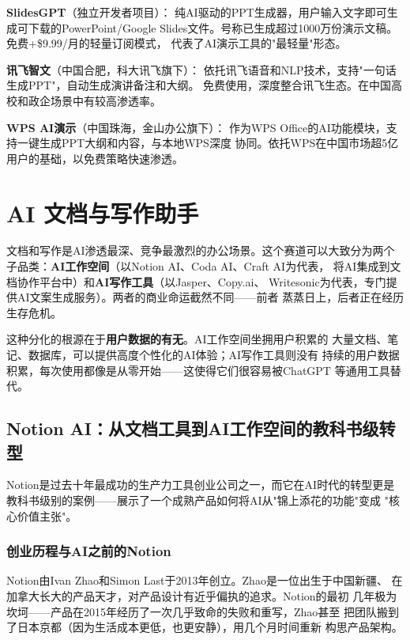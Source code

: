 \textbf{SlidesGPT}（独立开发者项目）：
纯AI驱动的PPT生成器，用户输入文字即可生成可下载的PowerPoint/Google
Slides文件。号称已生成超过1000万份演示文稿。免费+\$9.99/月的轻量订阅模式，
代表了AI演示工具的"最轻量"形态。

\textbf{讯飞智文}（中国合肥，科大讯飞旗下）：
依托讯飞语音和NLP技术，支持"一句话生成PPT"，自动生成演讲备注和大纲。
免费使用，深度整合讯飞生态。在中国高校和政企场景中有较高渗透率。

\textbf{WPS AI演示}（中国珠海，金山办公旗下）：
作为WPS Office的AI功能模块，支持一键生成PPT大纲和内容，与本地WPS深度
协同。依托WPS在中国市场超5亿用户的基础，以免费策略快速渗透。



\section{AI 文档与写作助手}
\label{sec:cprod-docs}

文档和写作是AI渗透最深、竞争最激烈的办公场景。这个赛道可以大致分为两个
子品类：\textbf{AI工作空间}（以Notion AI、Coda AI、Craft AI为代表，
将AI集成到文档协作平台中）和\textbf{AI写作工具}（以Jasper、Copy.ai、
Writesonic为代表，专门提供AI文案生成服务）。两者的商业命运截然不同——前者
蒸蒸日上，后者正在经历生存危机。

这种分化的根源在于\textbf{用户数据的有无}。AI工作空间坐拥用户积累的
大量文档、笔记、数据库，可以提供高度个性化的AI体验；AI写作工具则没有
持续的用户数据积累，每次使用都像是从零开始——这使得它们很容易被ChatGPT
等通用工具替代。

\subsection{Notion AI：从文档工具到AI工作空间的教科书级转型}
\label{subsec:notion-ai}

Notion是过去十年最成功的生产力工具创业公司之一，而它在AI时代的转型更是
教科书级别的案例——展示了一个成熟产品如何将AI从"锦上添花的功能"变成
"核心价值主张"。

\subsubsection{创业历程与AI之前的Notion}
Notion由Ivan Zhao和Simon Last于2013年创立。Zhao是一位出生于中国新疆、
在加拿大长大的产品天才，对产品设计有近乎偏执的追求。Notion的最初
几年极为坎坷——产品在2015年经历了一次几乎致命的失败和重写，Zhao甚至
把团队搬到了日本京都（因为生活成本更低，也更安静），用几个月时间重新
构思产品架构。

